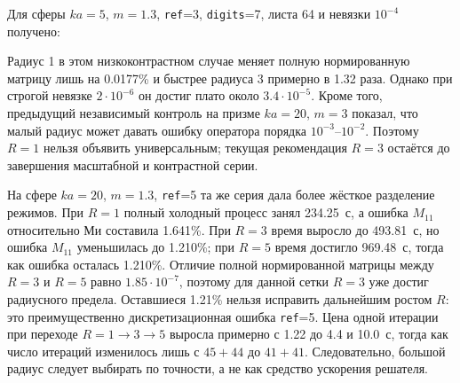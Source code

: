 \documentclass[12pt,a4paper]{article}
\begin{document}
Для сферы $ka=5$, $m=1.3$, \texttt{ref}=3, \texttt{digits}=7, листа 64 и
невязки $10^{-4}$ получено:
\begin{table}[H]
\centering
\caption{Холодная стоимость радиуса ближней зоны. Ошибка измерена относительно
$R=5$ на той же сетке и не является сеточной ошибкой относительно Ми.}
\end{table}
Радиус 1 в этом низкоконтрастном случае меняет полную нормированную матрицу
лишь на 0.0177\% и быстрее радиуса 3 примерно в 1.32 раза. Однако при строгой
невязке $2\cdot10^{-6}$ он достиг плато около $3.4\cdot10^{-5}$. Кроме того,
предыдущий независимый контроль на призме $ka=20$, $m=3$ показал, что малый
радиус может давать ошибку оператора порядка $10^{-3}$--$10^{-2}$. Поэтому
$R=1$ нельзя объявить универсальным; текущая рекомендация $R=3$ остаётся до
завершения масштабной и контрастной серии.

На сфере $ka=20$, $m=1.3$, \texttt{ref}=5 та же серия дала более жёсткое
разделение режимов. При $R=1$ полный холодный процесс занял 234.25~с, а ошибка
$M_{11}$ относительно Ми составила 1.641\%. При $R=3$ время выросло до
493.81~с, но ошибка $M_{11}$ уменьшилась до 1.210\%; при $R=5$ время достигло
969.48~с, тогда как ошибка осталась 1.210\%. Отличие полной нормированной
матрицы между $R=3$ и $R=5$ равно $1.85\cdot10^{-7}$, поэтому для данной
сетки $R=3$ уже достиг радиусного предела. Оставшиеся 1.21\% нельзя исправить
дальнейшим ростом $R$: это преимущественно дискретизационная ошибка
\texttt{ref}=5. Цена одной итерации при переходе $R=1\to3\to5$ выросла
примерно с 1.22 до 4.4 и 10.0~с, тогда как число итераций изменилось лишь с
$45+44$ до $41+41$. Следовательно, большой радиус следует выбирать по
точности, а не как средство ускорения решателя.
\end{document}
